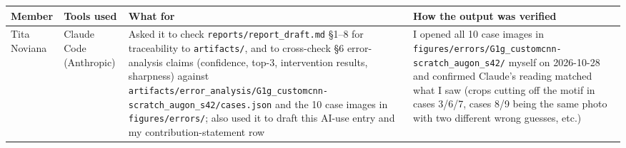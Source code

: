 \documentclass[10pt,a4paper]{article}
\newcounter{none} %
\begin{document}
{\def\LTcaptype{none} %
\begin{longtable}[]{@{}
  >{\raggedright\arraybackslash}p{}
  >{\raggedright\arraybackslash}p{}
  >{\raggedright\arraybackslash}p{}
  >{\raggedright\arraybackslash}p{}@{}}
\toprule\noalign{}
\begin{minipage}[b]{\linewidth}\raggedright
Member
\end{minipage} & \begin{minipage}[b]{\linewidth}\raggedright
Tools used
\end{minipage} & \begin{minipage}[b]{\linewidth}\raggedright
What for
\end{minipage} & \begin{minipage}[b]{\linewidth}\raggedright
How the output was verified
\end{minipage} \\
\midrule\noalign{}
\endhead
\bottomrule\noalign{}
\endlastfoot
Tita Noviana & Claude Code (Anthropic) & Asked it to check \texttt{reports/\allowbreak{}report\_\allowbreak{}draft.md} §1--8 for traceability to \texttt{artifacts/\allowbreak{}}, and to cross-check §6 error-analysis claims (confidence, top-3, intervention results, sharpness) against \texttt{artifacts/\allowbreak{}error\_\allowbreak{}analysis/\allowbreak{}G1g\_\allowbreak{}customcnn-\allowbreak{}scratch\_\allowbreak{}augon\_\allowbreak{}s42/\allowbreak{}cases.json} and the 10 case images in \texttt{figures/\allowbreak{}errors/\allowbreak{}}; also used it to draft this AI-use entry and my contribution-statement row & I opened all 10 case images in \texttt{figures/\allowbreak{}errors/\allowbreak{}G1g\_\allowbreak{}customcnn-\allowbreak{}scratch\_\allowbreak{}augon\_\allowbreak{}s42/\allowbreak{}} myself on 2026-10-28 and confirmed Claude's reading matched what I saw (crops cutting off the motif in cases 3/6/7, cases 8/9 being the same photo with two different wrong guesses, etc.) \\

\end{longtable}}
\end{document}
